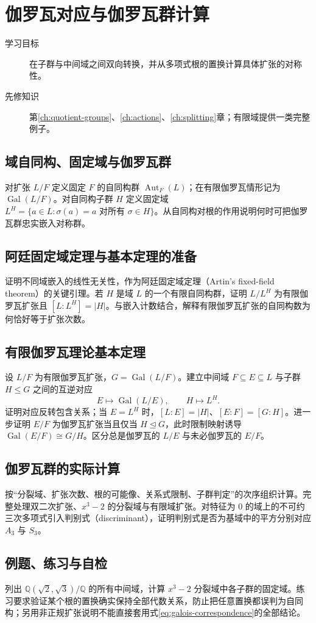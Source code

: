 \setcounter{chapter}{17} %
\chapter{伽罗瓦对应与伽罗瓦群计算}\label{ch:galois}

\begin{description}
  \item[学习目标] 在子群与中间域之间双向转换，并从多项式根的置换计算具体扩张的对称性。
  \item[先修知识] 第\ref{ch:quotient-groups}、\ref{ch:actions}、\ref{ch:splitting}章；有限域提供一类完整例子。
\end{description}

\section{域自同构、固定域与伽罗瓦群}
对扩张 $L/F$ 定义固定 $F$ 的自同构群 $\operatorname{Aut}_F(L)$；在有限伽罗瓦情形记为 $\operatorname{Gal}(L/F)$。对自同构子群 $H$ 定义固定域 $L^H=\{a\in L:\sigma(a)=a\text{ 对所有 }\sigma\in H\}$。从自同构对根的作用说明何时可把伽罗瓦群忠实嵌入对称群。

\section{阿廷固定域定理与基本定理的准备}
证明不同域嵌入的线性无关性，作为阿廷固定域定理（Artin's fixed-field theorem）的关键引理。若 $H$ 是域 $L$ 的一个有限自同构群，证明 $L/L^H$ 为有限伽罗瓦扩张且 $[L:L^H]=|H|$。与嵌入计数结合，解释有限伽罗瓦扩张的自同构数为何恰好等于扩张次数。

\section{有限伽罗瓦理论基本定理}
设 $L/F$ 为有限伽罗瓦扩张，$G=\operatorname{Gal}(L/F)$。建立中间域 $F\subseteq E\subseteq L$ 与子群 $H\leq G$ 之间的互逆对应
\begin{equation}\label{eq:galois-correspondence}
  E\longmapsto\operatorname{Gal}(L/E),
  \qquad H\longmapsto L^H.
\end{equation}
证明对应反转包含关系；当 $E=L^H$ 时，$[L:E]=|H|$、$[E:F]=[G:H]$。进一步证明 $E/F$ 为伽罗瓦扩张当且仅当 $H\trianglelefteq G$，此时限制映射诱导 $\operatorname{Gal}(E/F)\cong G/H$。区分总是伽罗瓦的 $L/E$ 与未必伽罗瓦的 $E/F$。

\section{伽罗瓦群的实际计算}
按“分裂域、扩张次数、根的可能像、关系式限制、子群判定”的次序组织计算。完整处理双二次扩张、$x^3-2$ 的分裂域与有限域扩张。对特征为 $0$ 的域上的不可约三次多项式引入判别式（discriminant），证明判别式是否为基域中的平方分别对应 $A_3$ 与 $S_3$。

\section{例题、练习与自检}
列出 $\mathbb Q(\sqrt2,\sqrt3)/\mathbb Q$ 的所有中间域，计算 $x^3-2$ 分裂域中各子群的固定域。练习要求验证某个根的置换确实保持全部代数关系，防止把任意置换都误判为自同构；另用非正规扩张说明不能直接套用式\eqref{eq:galois-correspondence}的全部结论。

